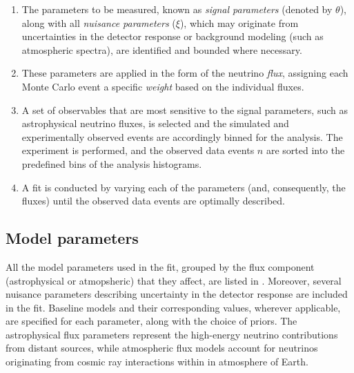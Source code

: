 \begin{enumerate}
    \item The parameters to be measured, known as \emph{signal parameters} (denoted by $\theta$), along with all \emph{nuisance parameters} ($\xi$), which may originate from uncertainties in the detector response or background modeling (such as atmospheric spectra), are identified and bounded where necessary.
    \item These parameters are applied in the form of the neutrino \emph{flux}, assigning each Monte Carlo event a specific \emph{weight} based on the individual fluxes.

    \item A set of observables that are most sensitive to the signal parameters, such as astrophysical neutrino fluxes, is selected and the simulated and experimentally observed events are accordingly binned for the analysis. The experiment is performed, and the observed data events $n$ are sorted into the predefined bins of the analysis histograms.
    \
    \item  A fit is conducted by varying each of the parameters (and, consequently, the fluxes) until the observed data events are optimally described. 
\end{enumerate}


\subsection{Model parameters}
\label{sec:params}
All the model parameters used in the fit, grouped by the flux component (astrophysical or atmopsheric) that they affect, are listed in . Moreover, several nuisance parameters describing uncertainty in the detector response are included in the fit. Baseline models and their corresponding values, wherever applicable, are specified for each parameter, along with the choice of priors. The astrophysical flux parameters represent the high-energy neutrino contributions from distant sources, while atmospheric flux models account for neutrinos originating from cosmic ray interactions within in atmosphere of Earth. 

